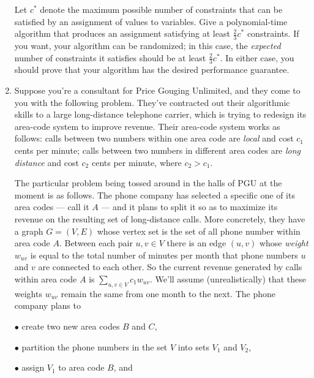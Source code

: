 \documentclass[12pt]{article}
\begin{document}
\begin{enumerate}
Let $c^*$ denote the maximum possible number of constraints
that can be satisfied by an assignment of values to variables.
Give a polynomial-time algorithm that produces an
assignment satisfying at least $\frac23 c^*$ constraints.
If you want, your algorithm can be randomized;
in this case, the {\em expected} number of constraints
it satisfies should be at least $\frac23 c^*$.
In either case, you should prove that your algorithm
has the desired performance guarantee.





\item

Suppose you're a consultant for
Price Gouging Unlimited, and they come to you with
the following problem.
They've contracted out their algorithmic skills
to a large long-distance telephone carrier,
which is trying to redesign its area-code system to improve revenue.
Their area-code system works as follows:
calls between two numbers within one area code are {\em local}
and cost $c_1$ cents per minute; calls between two numbers
in different area codes are {\em long distance} and cost
$c_2$ cents per minute, where $c_2 > c_1$.

The particular problem being tossed around in the
halls of PGU at the moment is as follows.
The phone company has selected a specific one of its area codes
--- call it $A$ ---
and it plans to split it so as to maximize its revenue on
the resulting set of long-distance calls.
More concretely, they have a graph $G = (V,E)$ whose vertex set
is the set of all phone number within area code $A$.
Between each pair $u, v \in V$ there is an edge $(u,v)$
whose {\em weight} $w_{uv}$ is equal to the total number of
minutes per month that phone numbers $u$ and $v$ are connected
to each other.  So the current revenue generated by calls
within area code $A$ is $\sum_{u,v \in V} c_1 w_{uv}$.
We'll assume (unrealistically) that these weights $w_{uv}$
remain the same from one month to the next.
The phone company plans to

$\bullet$ create two new area codes $B$ and $C$,

$\bullet$ partition the phone numbers in the set $V$ into sets $V_1$ and $V_2$,

$\bullet$ assign $V_1$ to area code $B$, and


\end{enumerate}
\end{document}
